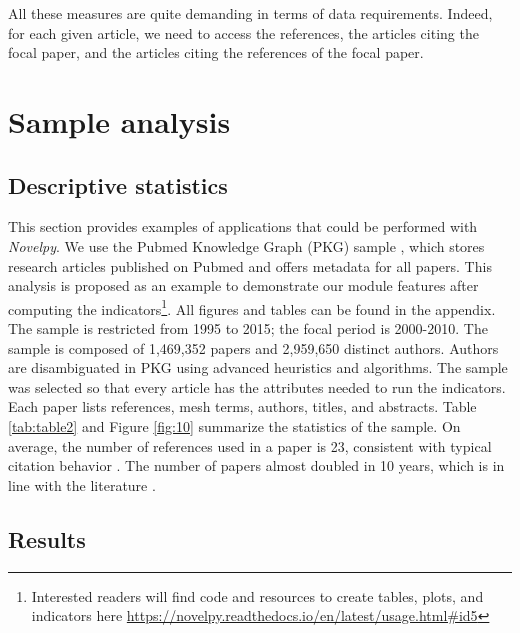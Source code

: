 All these measures are quite demanding in terms of data requirements. Indeed, for each given article, we need to access the references, the articles citing the focal paper, and the articles citing the references of the focal paper.

\section{Sample analysis}
\subsection{Descriptive statistics}
This section provides examples of applications that could be performed with \textit{Novelpy}. We use the Pubmed Knowledge Graph (PKG) sample \citep{xu2020building}, which stores research articles published on Pubmed and offers metadata for all papers. This analysis is proposed as an example to demonstrate our module features after computing the indicators\footnote{ \justifying Interested readers will find code and resources to create tables, plots, and indicators here \url{https://novelpy.readthedocs.io/en/latest/usage.html#id5}}. All figures and tables can be found in the appendix. The sample is restricted from 1995 to 2015; the focal period is 2000-2010. The sample is composed of 1,469,352 papers and 2,959,650 distinct authors. Authors are disambiguated in PKG using advanced heuristics and algorithms. The sample was selected so that every article has the attributes needed to run the indicators. Each paper lists references, mesh terms, authors, titles, and abstracts. Table \ref{tab:table2} and Figure \ref{fig:10} summarize the statistics of the sample. On average, the number of references used in a paper is 23, consistent with typical citation behavior \citep{abt2002relationship}. The number of papers almost doubled in 10 years, which is in line with the literature \citep{fortunato2018science}.


\subsection{Results}
\label{sec:resnovpy}

